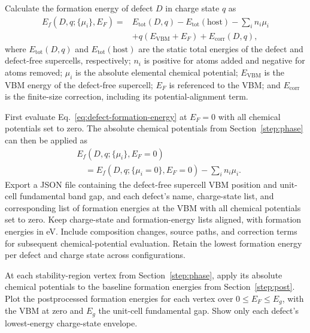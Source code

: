 \documentclass[aip,jap,reprint,amsmath,amssymb]{revtex4-2}
\begin{document}
Calculate the formation energy of defect $D$ in charge state $q$ as\cite{Freysoldt2014}
\begin{equation}\label{eq:defect-formation-energy}
\begin{aligned}
E_f(D,q;\{\mu_i\},E_F)
={}& E_{\mathrm{tot}}(D,q)-E_{\mathrm{tot}}(\mathrm{host})
-\sum_i n_i\mu_i \\
&+q(E_{\mathrm{VBM}}+E_F)+E_{\mathrm{corr}}(D,q),
\end{aligned}
\end{equation}
where $E_{\mathrm{tot}}(D,q)$ and $E_{\mathrm{tot}}(\mathrm{host})$ are the static total energies of the defect and defect-free supercells, respectively; $n_i$ is positive for atoms added and negative for atoms removed; $\mu_i$ is the absolute elemental chemical potential; $E_{\mathrm{VBM}}$ is the VBM energy of the defect-free supercell; $E_F$ is referenced to the VBM; and $E_{\mathrm{corr}}$ is the finite-size correction, including its potential-alignment term.

First evaluate Eq.~\eqref{eq:defect-formation-energy} at $E_F=0$ with all chemical potentials set to zero. The absolute chemical potentials from Section~\ref{step:phase} can then be applied as
\begin{equation}\label{eq:chemical-potential-contribution}
\begin{aligned}
&E_f(D,q;\{\mu_i\},E_F=0) \\
&\quad = E_f(D,q;\{\mu_i=0\},E_F=0) - \sum_i n_i\mu_i.
\end{aligned}
\end{equation}
Export a JSON file containing the defect-free supercell VBM position and unit-cell fundamental band gap, and each defect's name, charge-state list, and corresponding list of formation energies at the VBM with all chemical potentials set to zero. Keep charge-state and formation-energy lists aligned, with formation energies in eV. Include composition changes, source paths, and correction terms for subsequent chemical-potential evaluation. Retain the lowest formation energy per defect and charge state across configurations.

At each stability-region vertex from Section~\ref{step:phase}, apply its absolute chemical potentials to the baseline formation energies from Section~\ref{step:post}. Plot the postprocessed formation energies for each vertex over $0\leq E_F\leq E_g$, with the VBM at zero and $E_g$ the unit-cell fundamental gap. Show only each defect's lowest-energy charge-state envelope.
\end{document}
